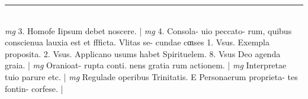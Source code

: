 \documentclass{article}
\begin{document}
\begin{pages}
\vspace{0.5cm}\noindent
\vspace{0.2cm}\rule{1cm}{0.2pt}\\ 
\hspace{0.2cm}\textit{mg}
\footnotesize 3. Homofe Iipsum debet noscere. 
\normalsize| 
\hspace{0.2cm}\textit{mg}
\footnotesize 4. Consola- uio peccato- rum, quibus conscienua lauxia est et ffficta. Vlitas se- cundae cαιses 1. Vsus. Exempla proposita. 2. Vsus. Applicano usums habet Spirituelem. 8. Vsus Deo agenda graia. 
\normalsize| 
\hspace{0.2cm}\textit{mg}
\footnotesize Oranioat- rupta conti. nens gratia rum actionem. 
\normalsize| 
\hspace{0.2cm}\textit{mg}
\footnotesize Interpretae tuio parure etc. 
\normalsize| 
\hspace{0.2cm}\textit{mg}
\footnotesize Regulade operibus Trinitatis. E Personaerum proprieta- tes fontin- corfese. 
\normalsize| 

\end{pages}
\end{document}
